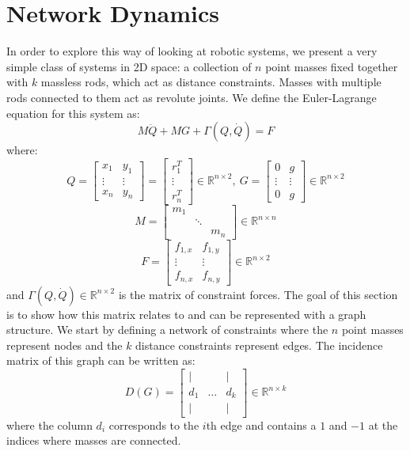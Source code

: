 \documentclass[conference]{IEEEtran}
\begin{document}
\section{Network Dynamics}
In order to explore this way of looking at robotic systems, we present a very simple class of systems in 2D space: a collection of $n$ point masses fixed together with $k$ massless rods, which act as distance constraints. Masses with multiple rods connected to them act as revolute joints. We define the Euler-Lagrange equation for this system as:
\begin{equation} \label{eq:EL}
    M\ddot{Q}+MG+\Gamma(Q,\dot{Q})=F
\end{equation}
where:
$$Q=\begin{bmatrix}
    x_1 & y_1\\
    \vdots & \vdots\\
    x_n & y_n
\end{bmatrix}=\begin{bmatrix}
    r_1^T\\ \vdots\\ r_n^T
\end{bmatrix}\in\mathbb{R}^{n\times2},\:
G=\begin{bmatrix}
    0 & g\\
    \vdots & \vdots\\
    0 & g
\end{bmatrix}\in\mathbb{R}^{n\times2}$$
$$M=\begin{bmatrix}
    m_1\\
    & \ddots\\
    & & m_n
\end{bmatrix}\in\mathbb{R}^{n\times n}$$
$$F=\begin{bmatrix}
    f_{1,x} & f_{1,y}\\
    \vdots & \vdots\\
    f_{n,x} & f_{n,y}
\end{bmatrix}\in\mathbb{R}^{n\times2}$$
and $\Gamma(Q,\dot{Q})\in\mathbb{R}^{n\times2}$ is the matrix of constraint forces. The goal of this section is to show how this matrix relates to and can be represented with a graph structure. We start by defining a network of constraints where the $n$ point masses represent nodes and the $k$ distance constraints represent edges. The incidence matrix of this graph can be written as:
$$D(G)= \begin{bmatrix}
    | & & |\\
    d_1 & \hdots & d_k\\
    | & & |
\end{bmatrix}\in\mathbb{R}^{n\times k}$$
where the column $d_i$ corresponds to the $i$th edge and contains a $1$ and $-1$ at the indices where masses are connected.
\end{document}
